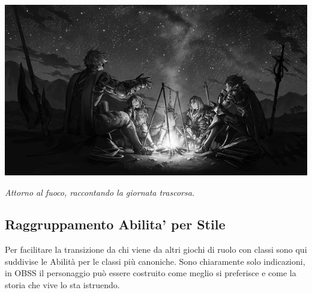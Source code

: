 \begin{center}

\includegraphics[width=0.9\linewidth]{immagini/Granblue.Fantasy.full.2108782.png}


\emph{Attorno al fuoco, raccontando la giornata trascorsa.}
\end{center}


\pagebreak

\subsection{Raggruppamento Abilita' per Stile}

Per facilitare la transizione da chi viene da altri giochi di ruolo con classi sono qui suddivise le Abilità per le classi più canoniche. Sono chiaramente solo indicazioni, in OBSS il personaggio può essere costruito come meglio si preferisce e come la storia che vive lo sta istruendo.

